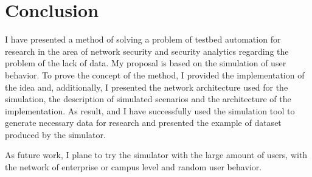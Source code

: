 
\section{Conclusion}

I have presented a method of solving a problem of testbed automation for research in the area of network security and security analytics regarding the problem of the lack of data. My proposal is based on the simulation of user behavior. To prove the concept of the method, I provided the implementation of the idea and, additionally, I presented the network  architecture used for the simulation, the description of simulated scenarios and the architecture of the implementation. As result, and I have successfully used the simulation tool to generate necessary data for research and presented the example of dataset produced by the simulator.

As future work, I plane to try the simulator with the large amount of users, with the network of enterprise or campus level and random user behavior.